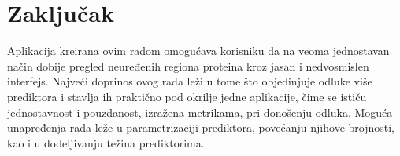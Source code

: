 \chapter{Zaključak}
Aplikacija kreirana ovim radom omogućava korisniku da na veoma jednostavan način dobije pregled neuređenih regiona proteina kroz jasan i nedvosmislen interfejs. Najveći doprinos ovog rada leži u tome što objedinjuje odluke više prediktora i stavlja ih praktično pod okrilje jedne aplikacije, čime se ističu jednostavnost i pouzdanost, izražena metrikama, pri donošenju odluka. Moguća unapređenja rada leže u parametrizaciji prediktora, povećanju njihove brojnosti, kao i u dodeljivanju težina prediktorima. 